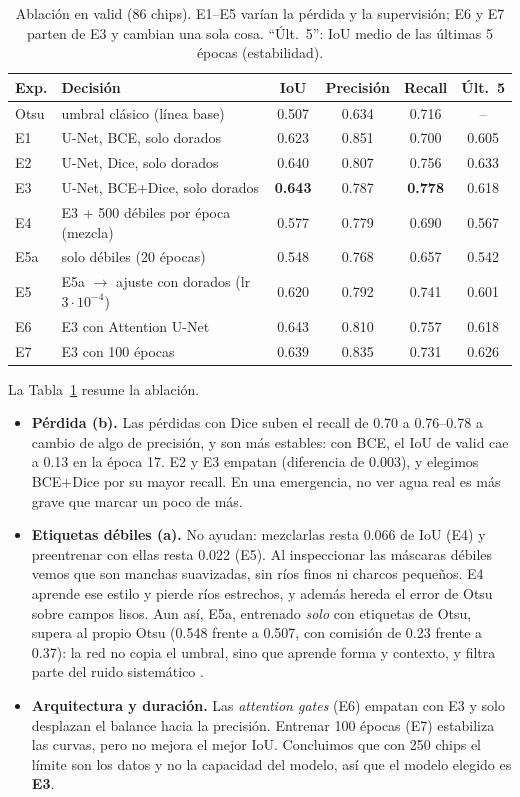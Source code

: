 \documentclass{article}
\begin{document}
\begin{table}[t]
  \caption{Ablación en valid (86 chips). E1--E5 varían la pérdida y la supervisión; E6 y E7 parten de E3 y cambian una sola cosa. ``Últ.~5'': IoU medio de las últimas 5 épocas (estabilidad).}
  \label{tab:ablacion}
  \centering
  \small
  \begin{tabular}{llcccc}
    \toprule
    Exp. & Decisión & IoU & Precisión & Recall & Últ.~5 \\
    \midrule
    Otsu & umbral clásico (línea base) & 0.507 & 0.634 & 0.716 & -- \\
    E1 & U-Net, BCE, solo dorados & 0.623 & 0.851 & 0.700 & 0.605 \\
    E2 & U-Net, Dice, solo dorados & 0.640 & 0.807 & 0.756 & 0.633 \\
    E3 & U-Net, BCE+Dice, solo dorados & \textbf{0.643} & 0.787 & \textbf{0.778} & 0.618 \\
    \midrule
    E4 & E3 + 500 débiles por época (mezcla) & 0.577 & 0.779 & 0.690 & 0.567 \\
    E5a & solo débiles (20 épocas) & 0.548 & 0.768 & 0.657 & 0.542 \\
    E5 & E5a $\rightarrow$ ajuste con dorados (lr $3\cdot10^{-4}$) & 0.620 & 0.792 & 0.741 & 0.601 \\
    \midrule
    E6 & E3 con Attention U-Net & 0.643 & 0.810 & 0.757 & 0.618 \\
    E7 & E3 con 100 épocas & 0.639 & 0.835 & 0.731 & 0.626 \\
    \bottomrule
  \end{tabular}
\end{table}

La Tabla~\ref{tab:ablacion} resume la ablación.
\begin{itemize}
  \item \textbf{Pérdida (b).} Las pérdidas con Dice suben el recall de 0.70 a 0.76--0.78 a cambio de algo de precisión, y son más estables: con BCE, el IoU de valid cae a 0.13 en la época 17. E2 y E3 empatan (diferencia de 0.003), y elegimos BCE+Dice por su mayor recall. En una emergencia, no ver agua real es más grave que marcar un poco de más.
  \item \textbf{Etiquetas débiles (a).} No ayudan: mezclarlas resta 0.066 de IoU (E4) y preentrenar con ellas resta 0.022 (E5). Al inspeccionar las máscaras débiles vemos que son manchas suavizadas, sin ríos finos ni charcos pequeños. E4 aprende ese estilo y pierde ríos estrechos, y además hereda el error de Otsu sobre campos lisos. Aun así, E5a, entrenado \emph{solo} con etiquetas de Otsu, supera al propio Otsu (0.548 frente a 0.507, con comisión de 0.23 frente a 0.37): la red no copia el umbral, sino que aprende forma y contexto, y filtra parte del ruido sistemático \citep{song2022}.
  \item \textbf{Arquitectura y duración.} Las \emph{attention gates} (E6) empatan con E3 y solo desplazan el balance hacia la precisión. Entrenar 100 épocas (E7) estabiliza las curvas, pero no mejora el mejor IoU. Concluimos que con 250 chips el límite son los datos y no la capacidad del modelo, así que el modelo elegido es \textbf{E3}.
\end{itemize}
\end{document}
